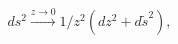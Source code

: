 \begin{equation}
\label{modified pads metric} ds^2 \stackrel{z \rightarrow 0}{\longrightarrow}1/z^2 (dz^2 +d\tilde{s} ^2),
\end{equation}

